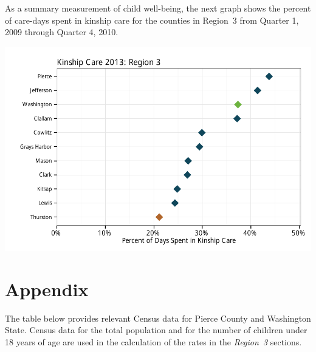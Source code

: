 \documentclass{article}\usepackage{graphicx, color}
\makeatletter
\def\maxwidth{ %
  \ifdim\Gin@nat@width>\linewidth
    \linewidth
  \else
    \Gin@nat@width
  \fi
}
\newenvironment{knitrout}{}{} %
\makeatother
\begin{document}
As a summary measurement of child well-being, the next graph shows the percent of care-days spent in kinship care for the counties in Region~3 from Quarter 1, 2009 through Quarter 4, 2010.
\nopagebreak[3]
\begin{knitrout}
\color{fgcolor}

{\centering \includegraphics[width=\maxwidth]{figure/ooh_wb} 

}



\end{knitrout}

\vspace{-18pt}

\section*{Appendix}

The table below provides relevant Census data for Pierce County and Washington State. Census data for the total population and for the number of children under 18 years of age are used in the calculation of the rates in the \emph{Region~3} sections.
\end{document}
